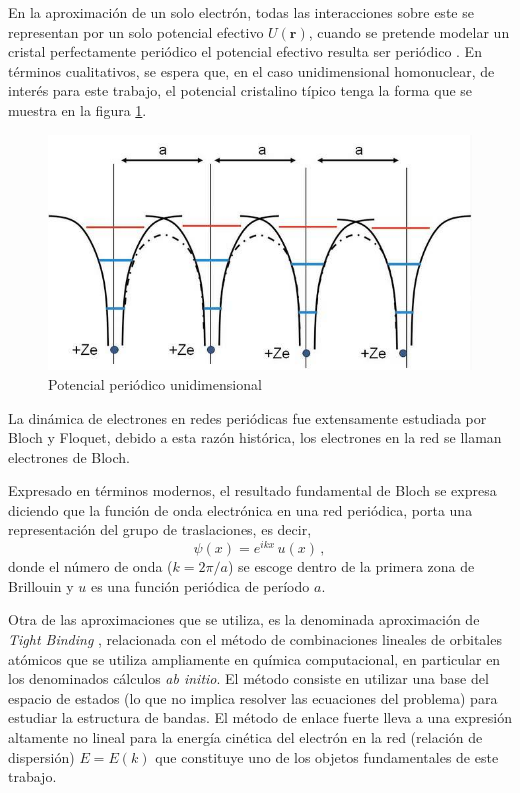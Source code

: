 En la aproximación de un solo electrón, todas las interacciones sobre este se representan por un solo potencial efectivo $U(\mathbf{r})$, cuando se pretende modelar un cristal perfectamente periódico el potencial efectivo resulta ser periódico \cite{ashc}. 
En términos cualitativos, se espera que, en el caso unidimensional homonuclear, de interés para este trabajo, el potencial cristalino típico tenga la forma que se muestra en la figura 
\ref{fig:periodic_potential}.
\begin{figure}[h]
    \centering
    \includegraphics[scale=.5]{./imagenes/Periodic_Potential_1.png}
    \caption{Potencial periódico unidimensional}
    \label{fig:periodic_potential}
\end{figure}

La dinámica de electrones en redes periódicas fue extensamente estudiada por Bloch y Floquet, debido a esta razón histórica, los electrones en la red se llaman electrones de Bloch.

Expresado en términos modernos, el resultado fundamental de Bloch se expresa diciendo que la función de onda electrónica en una red periódica, porta una representación del grupo de traslaciones, es decir,
\begin{equation}
    \psi(x)=e^{ikx}\,u(x)\,,
\end{equation}
donde el número de onda ($k=2\pi/a$) se escoge dentro de la primera zona de Brillouin y $u$ es una función periódica de período $a$.

Otra de las aproximaciones que se utiliza, es la denominada aproximación de \textit{Tight Binding} \cite{ashc}, relacionada con el método de combinaciones lineales de orbitales atómicos que se utiliza ampliamente en química computacional, en particular en los denominados cálculos {\it{ab initio}}. El método consiste en utilizar una base del espacio de estados (lo que no implica resolver las ecuaciones del problema) para estudiar la estructura de bandas. El método de enlace fuerte lleva a una expresión altamente no lineal para la energía cinética del electrón en la red (relación de dispersión) $E=E(k)$ que constituye uno de los objetos fundamentales de este trabajo.

